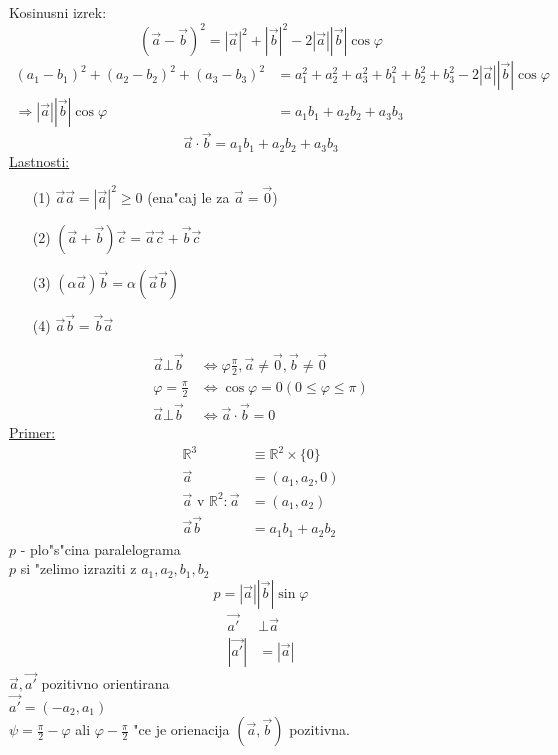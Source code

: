 Kosinusni izrek:
\[(\vec{a} - \vec{b})^2 = |\vec{a}|^2 + |\vec{b}|^2 - 2|\vec{a}||\vec{b}|\cos\varphi\]
\begin{align*}
	(a_1 - b_1)^2 + (a_2 - b_2)^2 + (a_3 - b_3)^2 &= a_1^2 + a_2^2 + a_3^2 + b_1^2 + b_2^2 + b_3^2 - 2|\vec{a}||\vec{b}|\cos\varphi\\
	\Rightarrow |\vec{a}||\vec{b}|\cos\varphi &= a_1b_1 + a_2b_2 + a_3b_3
\end{align*}
\[\vec{a} \cdot \vec{b} = a_1b_1 + a_2b_2 + a_3b_3\]
\underline{Lastnosti:}
\begin{enumerate}
	\item[(1)] \(\vec{a} \vec{a} = |\vec{a}|^2 \geq 0\) (ena"caj le za \(\vec{a} = \vec{0}\))
	\item[(2)] \((\vec{a} + \vec{b})\vec{c} = \vec{a}\vec{c} + \vec{b}\vec{c}\)
	\item[(3)] \((\alpha\vec{a})\vec{b} = \alpha(\vec{a}\vec{b})\)
	\item[(4)] \(\vec{a}\vec{b} = \vec{b}\vec{a}\)
\end{enumerate}
\begin{align*}
	\vec{a} \bot \vec{b} &\Leftrightarrow \varphi \frac{\pi}{2}, \vec{a} \neq \vec{0}, \vec{b} \neq \vec{0}\\
	\varphi = \frac{\pi}{2} &\Leftrightarrow \cos\varphi = 0 (0 \leq \varphi \leq \pi)\\
	\vec{a} \bot \vec{b} &\Leftrightarrow \vec{a} \cdot \vec{b} = 0
\end{align*}
\underline{Primer:}
\begin{align*}
	\mathbb{R}^3 &\equiv \mathbb{R}^2 \times \{0\}\\
	\vec{a} &= (a_1, a_2, 0)\\
	\vec{a} \text{ v } \mathbb{R}^2: \vec{a} &= (a_1, a_2)\\
	\vec{a} \vec{b} &= a_1b_1 + a_2b_2
\end{align*}
\(p\) - plo"s"cina paralelograma\\
\(p\) si "zelimo izraziti z \(a_1, a_2, b_1, b_2\)
\[p = |\vec{a}||\vec{b}|\sin\varphi\]
\begin{align*}
	\vec{a'} &\bot \vec{a}\\
	|\vec{a'}| &= |\vec{a}|
\end{align*}
\(\vec{a}, \vec{a'}\) pozitivno orientirana\\
\(\vec{a'} = (-a_2, a_1)\)\\
\(\psi = \frac{\pi}{2} - \varphi\) ali \(\varphi - \frac{\pi}{2}\) "ce je orienacija \((\vec{a}, \vec{b})\) pozitivna.

